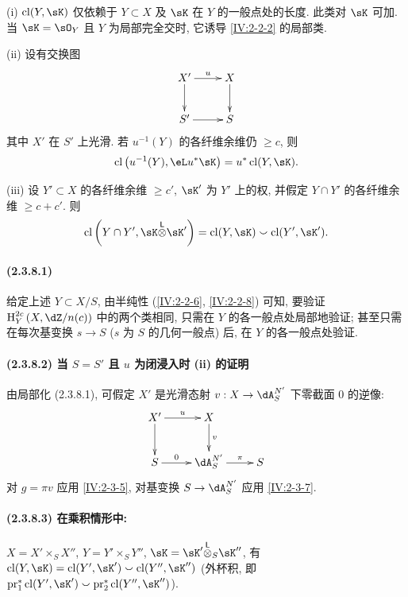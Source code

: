 \begin{theorem}\label{IV:2-3-8}
(i) $\cl(Y,\sK)$ 仅依赖于 $Y\subset X$ 及 $\sK$ 在 $Y$ 的一般点处的长度.
此类对 $\sK$ 可加. 当 $\sK=\sO_Y$ 且 $Y$ 为局部完全交时,
它诱导 \ref{IV:2-2-2} 的局部类.

(ii) 设有交换图
\[\xymatrix{
  X' \ar[r]^-u \ar[d]
    & X \ar[d] \\
  S' \ar[r]
    & S
}\]
其中 $X'$ 在 $S'$ 上光滑. 若 $u^{-1}(Y)$ 的各纤维余维仍 $\geqslant c$, 则
\[
  \cl\left(u^{-1}(Y),\eL u^\ast\sK\right) = u^\ast \cl(Y,\sK) \text{.}
\]

(iii) 设 $Y'\subset X$ 的各纤维余维 $\geqslant c'$,
$\sK'$ 为 $Y'$ 上的权, 并假定 $Y\cap Y'$ 的各纤维余维 $\geqslant c+c'$. 则
\[
\cl\left(Y\cap Y',\sK\lotimes \sK'\right) = \cl(Y,\sK) \smallsmile \cl(Y',\sK') \text{.}
\]
\end{theorem}

\paragraph{(2.3.8.1)}
给定上述 $Y\subset X/S$, 由半纯性 (\ref{IV:2-2-6}, \ref{IV:2-2-8}) 可知,
要验证 $\h_Y^{2 c}\left(X,\dZ/n(c)\right)$ 中的两个类相同,
只需在 $Y$ 的各一般点处局部地验证;
甚至只需在每次基变换 $s\to S$ ($s$ 为 $S$ 的几何一般点) 后, 在 $Y$ 的各一般点处验证.

\paragraph{(2.3.8.2) 当 $S=S'$ 且 $u$ 为闭浸入时 (ii) 的证明}
由局部化 (2.3.8.1), 可假定 $X'$ 是光滑态射 $v:X\to \dA_S^{N'}$ 下零截面 $0$ 的逆像:
\[\xymatrix{
  X' \ar[r]^-u \ar[d]
    & X \ar[d]^-v \\
  S \ar[r]^-0
    & \dA_S^{N'} \ar[r]^-\pi
    & S
}\]
对 $g=\pi v$ 应用 \ref{IV:2-3-5}, 对基变换 $S\to \dA_S^{N'}$ 应用 \ref{IV:2-3-7}.

\paragraph{(2.3.8.3) 在乘积情形中:}
$X=X'\times_S X''$, $Y=Y'\times_S Y''$, $\sK=\sK'\lotimes_S \sK''$, 有
$\cl(Y,\sK) = \cl(Y',\sK')\smallsmile \cl(Y'',\sK'')$
(外杯积, 即 $\operatorname{pr}_1^\ast \cl(Y',\sK')\smallsmile \operatorname{pr}_2^\ast \cl(Y'',\sK'')$).

